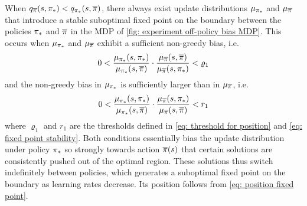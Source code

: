 When $q_{\overline{\pi}}(s, {\pi}_*) < q_{{\pi}_*}(s, \overline{\pi})$,
there always exist update distributions $\mu_{{\pi}_*}$ and $\mu_{\overline{\pi}}$ that introduce a stable suboptimal fixed point on the boundary between the policies ${\pi}_*$ and $\overline{\pi}$ in the MDP of \autoref{fig: experiment off-policy bias MDP}.
This occurs when $\mu_{{\pi}_*}$ and $\mu_{\overline{\pi}}$ exhibit a sufficient non-greedy bias, i.e.
\begin{align}
    0
    <
    \dfrac{\mu_{{\pi}_*}(s, {\pi}_*)}{\mu_{{\pi}_*}(s, \overline{\pi})} 
    \cdot
    \dfrac{\mu_{\overline{\pi}}(s, \overline{\pi})}{\mu_{\overline{\pi}}(s, {\pi}_*)}
    < 
    \varrho_1
\end{align}
and the non-greedy bias in $\mu_{{\pi}_*}$ is sufficiently larger than in $\mu_{\overline{\pi}}$, i.e.
\begin{align}
    0
    <
    \dfrac{\mu_{{\pi}_*}(s, {\pi}_*)}{\mu_{{\pi}_*}(s, \overline{\pi})} 
    \cdot
    \dfrac{\mu_{\overline{\pi}}(s, {\pi}_*)}{\mu_{\overline{\pi}}(s, \overline{\pi})}
    < 
    r_1
\end{align}
where $\varrho_1$ and $r_1$ are the thresholds defined in \eqref{eq: threshold for position} and \eqref{eq: fixed point stability}.
Both conditions essentially bias the update distribution under policy ${\pi}_*$ so strongly towards action $\overline{\pi}(s)$ that certain solutions are consistently pushed out of the optimal region.
These solutions thus switch indefinitely between policies, which generates a suboptimal fixed point on the boundary as learning rates decrease.
Its position follows from \eqref{eq: position fixed point}.




